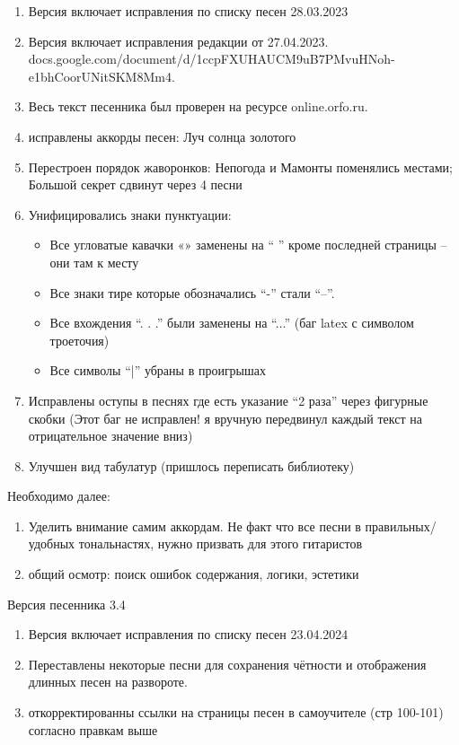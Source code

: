 \documentclass[fleqn,a5paper,12pt,twoside]{guitartabs}
\begin{document}
\begin{enumerate}
\item Версия включает исправления по списку песен 28.03.2023
\item Версия включает исправления редакции от 27.04.2023. \\ docs.google.com/document/d/1ccpFXUHAUCM9uB7PMvuHNoh-e1bhCoorUNitSKM8Mm4. 
\item Весь текст песенника был проверен на ресурсе online.orfo.ru.
\item исправлены аккорды песен: Луч солнца золотого
\item Перестроен порядок жаворонков: Непогода и Мамонты поменялись местами; Большой секрет сдвинут через 4 песни
\item Унифицировались знаки пунктуации:
\begin{itemize}
    \item Все угловатые кавачки «» заменены на `` '' кроме последней страницы -- они там к месту
    \item Все знаки тире которые обозначались ``-'' стали ``--''.
    \item Все вхождения ``. . .'' были заменены на ``...'' (баг latex с символом троеточия)
    \item Все символы ``|'' убраны в проигрышах
\end{itemize} 
\item Исправлены оступы в песнях где есть указание  ``2 раза'' через фигурные скобки (Этот баг не исправлен! я вручную передвинул каждый текст на отрицательное значение вниз)
\item Улучшен вид табулатур (пришлось переписать библиотеку)
\end{enumerate}
Необходимо далее:
\begin{enumerate}
\item Уделить внимание самим аккордам. Не факт что все песни в правильных/удобных тональнастях, нужно призвать для этого гитаристов
\item общий осмотр: поиск ошибок содержания, логики, эстетики
\end{enumerate}
\newpage
Версия песенника 3.4
\begin{enumerate}
\item Версия включает исправления по списку песен 23.04.2024
\item Переставлены некоторые песни для сохранения чётности и отображения длинных песен на развороте.
\item откорректированны ссылки на страницы песен в самоучителе (стр 100-101) согласно правкам выше
\end{enumerate}
\end{document}
